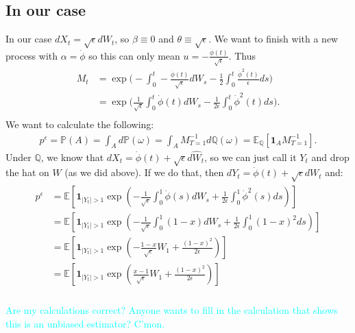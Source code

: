 \documentclass[11pt]{amsart}
\newcommand{\noise}{\sqrt{\epsilon}}
\newcommand{\ydnote}[1]{{\textcolor{cyan}{#1}}}
\begin{document}
\subsection{In our case}
In our case $dX_t = \noise dW_t$, so $\beta \equiv 0$ and $\theta \equiv \noise$.
We want to finish with a new process with $\alpha = \dot{\phi}$ so this can only
mean $u = -\frac{\dot{\phi}(t)}{\noise}$. Thus
\begin{align*}
  M_t &= \exp \bigg ( - \int_0^t -\frac{\dot{\phi}(t)}{\noise}dW_s 
  -\frac{1}{2} \int_0^t \frac{\dot{\phi}^2(t)}{\epsilon}ds \bigg ) \\
  &=  \exp \bigg ( \frac{1}{\noise} \int_0^t \dot{\phi}(t)dW_s 
  -\frac{1}{2\epsilon} \int_0^t \dot{\phi}^2(t)ds \bigg ). \\
\end{align*}
We want to calculate the following:
\begin{align*}
  p^{\epsilon} = \mathbb{P}(A) = \int_A d\mathbb{P}(\omega) = 
  \int_A M_{T=1}^{-1} d\mathbb{Q}(\omega) = \mathbb{E}_{\mathbb{Q}}[\mathbf{1}_{A} M_{T=1}^{-1}].
\end{align*}
Under $\mathbb{Q}$, we know that $dX_t = \dot{\phi}(t) + \noise d\hat{W}_t$, so 
we can just call it $Y_t$ and drop the hat on $W$ (as we did above). If we do that,
then $dY_t = \dot{\phi}(t) + \noise dW_t$ and:
\begin{align}
  \begin{split}
  p^{\epsilon} &= \mathbb{E}\left [ \mathbf{1}_{ |Y_t| > 1 } \exp \left (
      -\frac{1}{\noise} \int_0^1 \dot{\phi}(s)dW_s  
      +\frac{1}{2\epsilon} \int_0^1 \dot{\phi}^2(s)ds \right ) \right ] \\
  &= \mathbb{E}\left [ \mathbf{1}_{ |Y_t| > 1 } \exp \left (
      -\frac{1}{\noise} \int_0^1 (1-x) dW_s  
      +\frac{1}{2\epsilon} \int_0^1 (1-x)^2 ds \right ) \right ] \\
  &= \mathbb{E}\left [ \mathbf{1}_{ |Y_t| > 1 } \exp \left (
      -\frac{1-x}{\noise} W_1 +\frac{(1-x)^2}{2\epsilon} \right ) \right ] \\
  &= \mathbb{E}\left [ \mathbf{1}_{ |Y_t| > 1 } \exp \left (
     \frac{x-1}{\noise} W_1 +\frac{(1-x)^2}{2\epsilon} \right ) \right ] \\
 \end{split}
\end{align}

\ydnote{Are my calculations correct? 
  Anyone wants to fill in the calculation that shows this is an 
  unbiased estimator? C'mon.}
\end{document}
